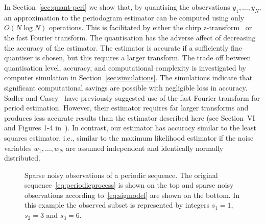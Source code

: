 \documentclass[10pt,twocolumn,twoside]{IEEEtran}
\begin{document}
In Section~\ref{sec:quant-peri} we show that, by quantising the observations $y_1,\dots,y_N$, an approximation to the periodogram estimator can be computed using only $O(N\log N)$ operations.  This is facilitated by either the chirp z-transform~\cite{Rabiner1969} or the fast Fourier transform.  The quantisation has the adverse affect of decreasing the accuracy of the estimator.  The estimator is accurate if a sufficiently fine quantiser is chosen, but this requires a larger transform.  The trade off between quantisation level, accuracy, and computational complexity is investigated by computer simulation in Section~\ref{sec:simulations}.  The simulations indicate that significant computational savings are possible with negligible loss in accuracy.  Sadler and Casey~\cite{726812} have previously suggested use of the fast Fourier transform for period estimation.  However, their estimator requires far larger transforms and produces less accurate results than the estimator described here (see Section~VI and Figures 1-4 in~\cite{726812}).  In contrast, our estimator has accuracy similar to the least squares estimator, i.e., similar to the maximum likelihood estimator if the noise variables $w_1,\dots,w_N$ are assumed independent and identically normally distributed.
 
{
\def\vertgap{2}
\def\ph{0.4}
\def\T{1.1}
\newcommand{\raxis}{\draw[->] (-0.25,0) -- (8,0) node[above] {$\reals$}; \draw (0,-0.06)-- node[below] {$0$} (0,0.06) }
\newcommand{\pulse}[1]{ \draw[->,>=latex] (#1,0) -- (#1,1) }
\newcommand{\pulsewithnode}[2]{ \draw[->,>=latex] (#1,0) -- node[right] {#2} (#1,1) }
\begin{figure}[t]
	\centering
{}
		\caption{Sparse noisy observations of a periodic sequence.  The original sequence~\eqref{eq:periodicprocess} is shown on the top and sparse noisy observations according to~\eqref{eq:sigmodel} are shown on the bottom.  In this example the observed subset is represented by integers $s_1=1$, $s_2=3$ and $s_3=6$.}
		\label{fig_stat_model}
\end{figure}
}
\end{document}
